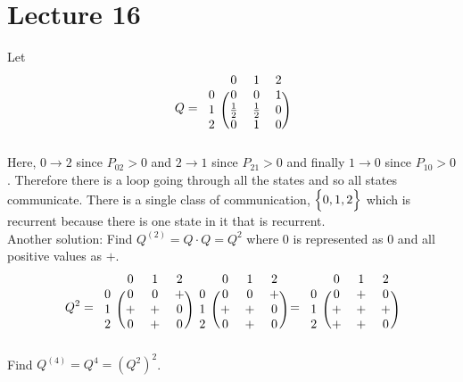 \documentclass[12pt]{article}
\begin{document}
\section{Lecture 16} 
Let $$Q = \begin{blockarray}{cccc}
&0&1&2 \\
\begin{block}{c(ccc)}
0 & 0 & 0 & 1 \\
1 & \frac{1}{2} & \frac{1}{2} & 0 \\ 
2 & 0 & 1 & 0  \\ \end{block} \end{blockarray} $$ Here, $0 \to 2$ since $P_{02} > 0$ and $2 \to 1$ since $P_{21} > 0$ and finally $1 \to 0$ since $P_{10} > 0$. Therefore there is a loop going through all the states and so all states communicate. There is a single class of communication, $\Big\{ 0,1,2 \Big\}$ which is recurrent because there is one state in it that is recurrent. \\
Another solution: Find $Q^{(2)} = Q \cdot Q = Q^2$ where $0$ is represented as $0$ and all positive values as $+$. 
$$ Q^2 = \begin{blockarray}{cccc}
&0&1&2 \\
\begin{block}{c(ccc)}
0 & 0 & 0 & + \\
1 & + & + & 0 \\ 
2 & 0 & + & 0  \\ \end{block} \end{blockarray} \begin{blockarray}{cccc}
&0&1&2 \\ \begin{block}{c(ccc)}
0 & 0 & 0 & + \\
1 & + & + & 0 \\ 
2 & 0 & + & 0  \\ \end{block} \end{blockarray} = \begin{blockarray}{cccc}
&0&1&2 \\ \begin{block}{c(ccc)}
0 & 0 & + & 0 \\
1 & + & + & + \\ 
2 & + & + & 0  \\ \end{block} \end{blockarray} $$ 
Find $Q^{(4)} = Q^4 = (Q^2)^2$. 
\end{document}
